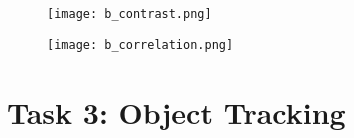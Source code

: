 \documentclass{report}
\begin{document}
\begin{appendices}
\begin{figure}
    \texttt{[image: b\_contrast.png]}
\end{figure}

\begin{figure}
    \texttt{[image: b\_correlation.png]}
\end{figure}

\pagebreak



\chapter{Task 3: Object Tracking} \label{sec:app_task3}



\end{appendices}
\end{document}
